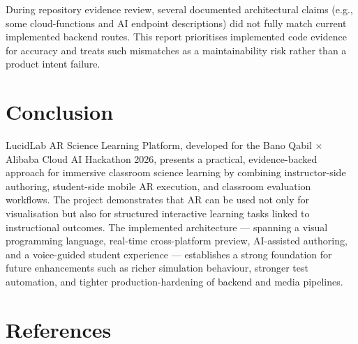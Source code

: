 \documentclass[12pt,a4paper]{article}
\begin{document}
During repository evidence review, several documented architectural claims (e.g., some
cloud-functions and AI endpoint descriptions) did not fully match current implemented
backend routes. This report prioritises implemented code evidence for accuracy and treats
such mismatches as a maintainability risk rather than a product intent failure.

\section{Conclusion}

LucidLab AR Science Learning Platform, developed for the Bano Qabil $\times$ Alibaba Cloud
AI Hackathon 2026, presents a practical, evidence-backed approach for
immersive classroom science learning by combining instructor-side authoring, student-side
mobile AR execution, and classroom evaluation workflows. The project demonstrates that AR
can be used not only for visualisation but also for structured interactive learning tasks
linked to instructional outcomes. The implemented architecture --- spanning a visual
programming language, real-time cross-platform preview, AI-assisted authoring, and a
voice-guided student experience --- establishes a strong foundation for future
enhancements such as richer simulation behaviour, stronger test automation, and tighter
production-hardening of backend and media pipelines.

\section{References}
\nocite{*}
\printbibliography
\end{document}
